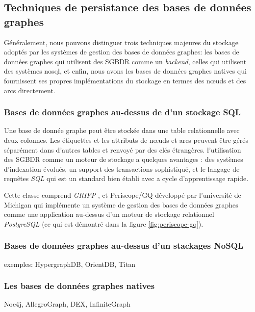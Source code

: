   \subsection{Techniques de persistance des bases de données graphes}
  \label{sec:persistence-tech}
  Généralement, nous pouvons distinguer trois techniques majeures du
  stockage adoptés par les systèmes de gestion des bases de données
  graphes: les bases de données graphes qui utilisent des
  \acrshort{SGBDR} comme un \emph{backend}, celles qui utilisent des
  systèmes \acrshort{nosql}, et enfin, nous avons les bases de données
  graphes natives qui fournissent ses propres implémentations du
  stockage en termes des nœuds et des arcs directement.

    \subsubsection{Bases de données graphes au-dessus de d'un stockage  SQL}
    \label{sec:graphdb-over-sql}
    Une base de donnée graphe peut être stockée dans une table
    relationnelle avec deux colonnes. Les étiquettes et les attributs
    de nœuds et arcs peuvent être gérés séparément dans d'autres
    tables et renvoyé par des clés étrangères. l'utilisation des
    \acrshort{SGBDR} comme un moteur de stockage a quelques avantages
    : des systèmes d'indexation évolués, un support des transactions
    sophistiqué, et le langage de requêtes \emph{SQL} qui est un
    standard bien établi avec a cycle d'apprentissage rapide.

      

    Cette classe comprend \emph{GRIPP} \cite{trissl2007fast}, et
    Periscope/GQ \cite{tian2008periscope} développé par l'université
    de Michigan qui implémente un système de gestion des bases de
    données graphes comme une application au-dessus d'un moteur de
    stockage relationnel \emph{PostgreSQL} (ce qui est démontré dans
    la figure \ref{fig:periscope-gq}).

    \subsubsection{Bases de données graphes au-dessus d'un stackages NoSQL}
    \label{sec:graphdb-over-nosql}

    exemples: HypergraphDB, OrientDB, Titan

    \subsubsection{Les bases de données graphes natives}
    \label{sec:graphdb-native}
    Noe4j, AllegroGraph, DEX, InfiniteGraph

